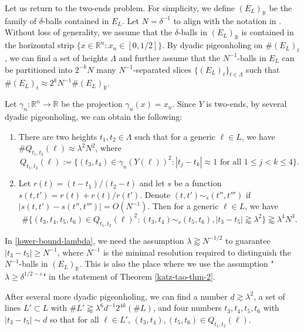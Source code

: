 \documentclass{amsart}
\numberwithin{equation}{section}
\newcommand{\ga}{\gamma}
\newcommand{\de}{\delta}
\newcommand{\e}{\varepsilon}
\newcommand{\la}{\lambda}
\newcommand{\La}{\Lambda}
\newcommand{\ZR}{\mathbb{R}}
\begin{document}
\smallskip

Let us return to the two-ends problem. 
For simplicity, we define $(E_L)_\ZR$ be the family of $\de$-balls contained in $E_L$.
Let $N=\de^{-1}$ to align with the notation in \cite{Katz-Tao-Kakeya-maximal}.
Without loss of generality, we assume that the $\de$-balls in $(E_L)_\ZR$ is contained in the horizontal strip $\{x\in\ZR^n:x_n\in[0,1/2]\}$.
By dyadic pigeonholing on $\#(E_L)_t$, we can find a set of heights $\La$ and further assume that the $N^{-1}$-balls in $E_L$ can be partitioned into $2^{-k}N$ many $N^{-1}$-separated slices $\{(E_L)_t\}_{t\in \La}$ such that $\#(E_L)_t\approx 2^kN^{-1}\#(E_L)_\ZR$.

Let $\ga_n:\ZR^n\to\ZR$ be the projection $\ga_n(x)=x_n$. Since $Y$ is two-ends, by several dyadic pigeonholing, we can obtain the following:
\begin{enumerate}
    \item There are two heights $t_1,t_2\in \La$ such that for a generic $\ell\in L$, we have $\# Q_{t_1,t_2}(\ell)\approx \la^2 N^2$, where
    \begin{equation}
        Q_{t_1,t_2}(\ell):=\{(t_3,t_4)\in\ga_n(Y(\ell))^2: |t_j-t_k|\approx1\text{ for all }1\leq j<k\leq4\}.
    \end{equation}
    \item Let $r(t)=(t-t_1)/(t_2-t)$ and let $s$ be a function $s(t,t')=r(t)+r(t)/r(t')$. Denote $(t,t')\sim_s(t'',t''')$ if $|s(t,t')-s(t'',t''')|=O(N^{-1})$. Then for a generic $\ell\in L$, we have
    \begin{equation}
    \label{lower-bound-lambda}
        \#\{(t_3,t_4,t_5,t_6)\in Q_{t_1,t_2}(\ell)^2:(t_3,t_4)\sim_s (t_5,t_6),|t_3-t_5|\gtrapprox\la^2\}\gtrapprox\la^4 N^3.
    \end{equation}
\end{enumerate}
In \eqref{lower-bound-lambda}, we need the assumption $\la\gtrapprox N^{-1/2}$ to guarantee $|t_3-t_5|\geq N^{-1}$, where $N^{-1}$ is the minimal resolution required to distinguish the $N^{-1}$-balls in $(E_L)_\ZR$.
This is also the place where we use the assumption "$\la\geq\de^{1/2-\e}$" in the statement of Theorem \ref{katz-tao-thm-2}.

\smallskip

After several more dyadic pigeonholing, we can find a number $d\gtrsim\la^2$, a set of lines $L'\subset L$ with $\# L'\gtrapprox\la^6d^{-1}2^{4k}(\#L)$, and four numbers $t_3,t_4,t_5,t_6$ with $|t_3-t_5|\sim d$ so that for all $\ell\in L'$, $(t_3,t_4), (t_5,t_6)\in Q_{t_1,t_2}(\ell)$.
\end{document}
